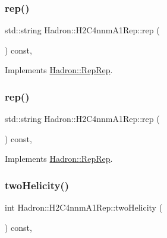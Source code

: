 \subsubsection{\texorpdfstring{rep()}{rep()}\hspace{0.1cm}{\footnotesize\ttfamily [4/5]}}
{\footnotesize\ttfamily std\+::string Hadron\+::\+H2\+C4nnm\+A1\+Rep\+::rep (\begin{DoxyParamCaption}{ }\end{DoxyParamCaption}) const\hspace{0.3cm}{\ttfamily [inline]}, {\ttfamily [virtual]}}



Implements \mbox{\hyperlink{structHadron_1_1RepRep_ab3213025f6de249f7095892109575fde}{Hadron\+::\+Rep\+Rep}}.

\mbox{\label{structHadron_1_1H2C4nnmA1Rep_ab84ffb9381f49b933c6c3fdf5936fa92}} 
\subsubsection{\texorpdfstring{rep()}{rep()}\hspace{0.1cm}{\footnotesize\ttfamily [5/5]}}
{\footnotesize\ttfamily std\+::string Hadron\+::\+H2\+C4nnm\+A1\+Rep\+::rep (\begin{DoxyParamCaption}{ }\end{DoxyParamCaption}) const\hspace{0.3cm}{\ttfamily [inline]}, {\ttfamily [virtual]}}



Implements \mbox{\hyperlink{structHadron_1_1RepRep_ab3213025f6de249f7095892109575fde}{Hadron\+::\+Rep\+Rep}}.

\mbox{\label{structHadron_1_1H2C4nnmA1Rep_ae55afbd5a5aede69fcb5415b54b00b07}} 
\subsubsection{\texorpdfstring{twoHelicity()}{twoHelicity()}\hspace{0.1cm}{\footnotesize\ttfamily [1/3]}}
{\footnotesize\ttfamily int Hadron\+::\+H2\+C4nnm\+A1\+Rep\+::two\+Helicity (\begin{DoxyParamCaption}{ }\end{DoxyParamCaption}) const\hspace{0.3cm}{\ttfamily [inline]}, {\ttfamily [virtual]}}

